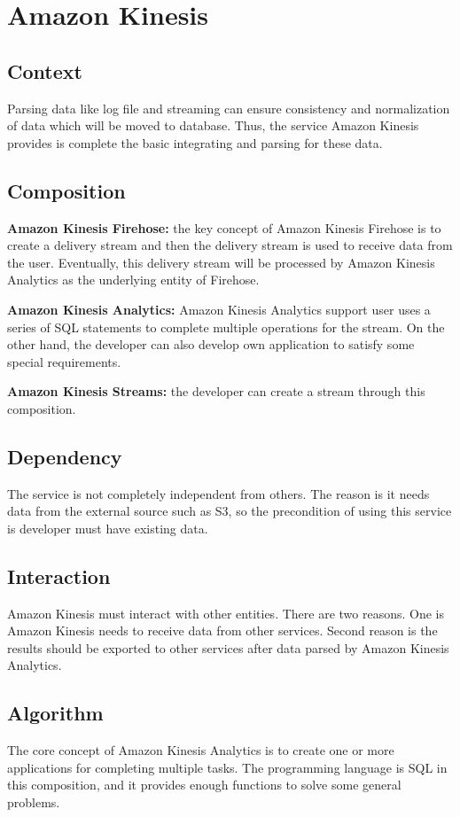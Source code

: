 \section{Amazon Kinesis}
	\subsection{Context}
    Parsing data like log file and streaming can ensure consistency and normalization of data which will be moved to database. Thus, the service Amazon Kinesis provides is complete the basic integrating and parsing for these data.
        
	\subsection{Composition}
    \textbf{Amazon Kinesis Firehose:} the key concept of Amazon Kinesis Firehose is to create a delivery stream and then the delivery stream is used to receive data from the user. Eventually, this delivery stream will be processed by Amazon Kinesis Analytics as the underlying entity of Firehose.\cite{z3}
    
    \noindent \textbf{Amazon Kinesis Analytics:} Amazon Kinesis Analytics support user uses a series of SQL statements to complete multiple operations for the stream. On the other hand, the developer can also develop own application to satisfy some special requirements.
     
    \noindent \textbf{Amazon Kinesis Streams:} the developer can create a stream through this composition.

	\subsection{Dependency}
    The service is not completely independent from others. The reason is it needs data from the external source such as S3, so the precondition of using this service is developer must have existing data.

	\subsection{Interaction}
    Amazon Kinesis must interact with other entities. There are two reasons. One is Amazon Kinesis needs to receive data from other services. Second reason is the results should be exported to other services after data parsed by Amazon Kinesis Analytics. 

	\subsection{Algorithm}
    The core concept of Amazon Kinesis Analytics is to create one or more applications for completing multiple tasks. The programming language is SQL in this composition, and it provides enough functions to solve some general problems.\\

